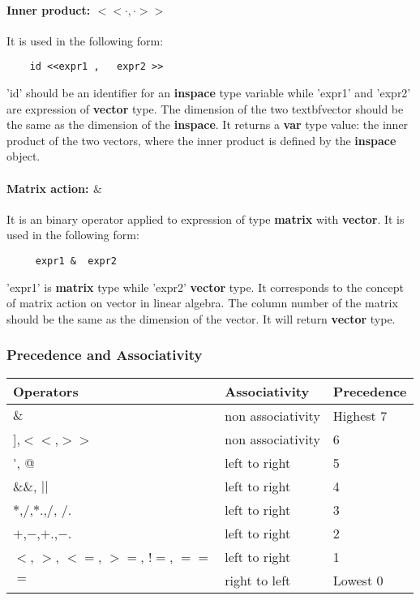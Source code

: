 \documentclass[12pt]{article} %
\begin{document}
\paragraph{ Inner product:  $<<  \cdot ,  \cdot >>  $}
It is used in the following form:
\begin{lstlisting}
    id <<expr1 ,   expr2 >>
\end{lstlisting}
'id' should be an identifier for an \textbf{inspace} type variable while 'expr1' and 'expr2'  are expression of  \textbf{vector} type. The dimension of the two textbf{vector} should be the same as the dimension of the \textbf{inspace}. It returns a  \textbf{var} type value: the  inner product of the two vectors, where the inner product is defined by the   \textbf{inspace} object.

\paragraph{ Matrix action: $\&$ }
It is an binary operator applied to expression of type \textbf{matrix}  with  \textbf{vector}. It is used in the following form:
\begin{lstlisting}
     expr1 &  expr2
\end{lstlisting}
'expr1' is \textbf{matrix} type while 'expr2' \textbf{vector} type.  It corresponds to the concept of matrix action on vector in linear algebra.   The column number of the matrix should be the same as the dimension of the vector. It will return \textbf{vector} type.

\subsubsection{Precedence and Associativity}
\begin{center}
	\begin{tabular}{|l|l|l|}
		\hline
		Operators & Associativity & Precedence\\ \hline
        $\&$  & non associativity & Highest 7  \\ \hline
		[[,]],$<<$,$>>$ & non associativity &    6\\ \hline
		\'{}, @ & left to right &  5\\ \hline
         $\&\&$, $||$ & left to right & 4\\ \hline
		$*$,$/$,$*$.,$/$, $/$. & left to right & 3 \\ \hline
		$+$,$-$,$+$.,$-$.  & left to right & 2\\ \hline
		$<$, $>$, $<=$, $>=$, $!=$, $==$ & left to right & 1\\ \hline
		$=$ & right to left & Lowest 0\\
		\hline
	\end{tabular}
\end{center}
\end{document}
